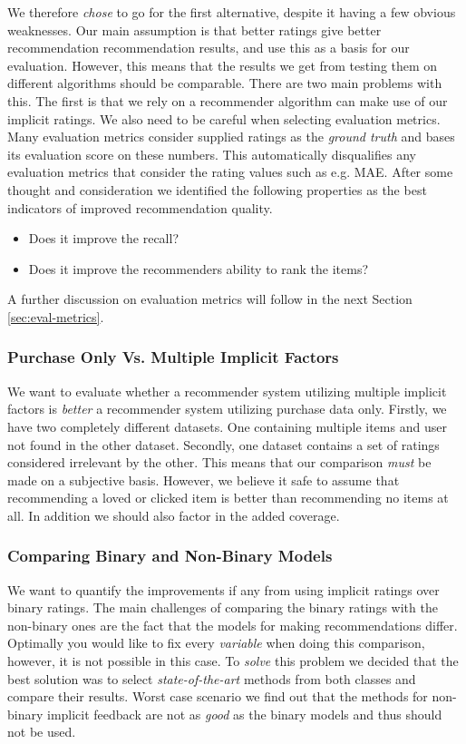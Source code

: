 We therefore \emph{chose} to go for the first alternative, despite it having a few obvious weaknesses.
Our main assumption is that better ratings give better recommendation recommendation results, and use this
as a basis for our evaluation. However, this means that the results we get from testing them
on different algorithms should be comparable. There are two main problems with this. The first is that
we rely on a recommender algorithm can make use of our implicit ratings. We also need to be careful
when selecting evaluation metrics. Many evaluation metrics consider supplied ratings as the \emph{ground truth}
and bases its evaluation score on these numbers. This automatically disqualifies any evaluation metrics
that consider the rating values such as e.g. MAE. After some thought and consideration
we identified the following properties as the best indicators of improved recommendation quality.

\begin{itemize}
\item Does it improve the recall?
\item Does it improve the recommenders ability to rank the items?
\end{itemize}

A further discussion on evaluation metrics will follow in the next Section \ref{sec:eval-metrics}.

\subsubsection{Purchase Only Vs. Multiple Implicit Factors}

We want to evaluate whether a recommender system utilizing multiple implicit factors is \emph{better}
a recommender system utilizing purchase data only. Firstly, we have two completely different datasets.
One containing multiple items and user not found in the other dataset. Secondly, one dataset
contains a set of ratings considered irrelevant by the other. This means that our comparison
\emph{must} be made on a subjective basis. However, we believe it safe to assume that recommending
a loved or clicked item is better than recommending no items at all. In addition we should also
factor in the added coverage.

\subsubsection{Comparing Binary and Non-Binary Models}

We want to quantify the improvements if any from using implicit ratings over binary ratings.
The main challenges of comparing the binary ratings with the non-binary ones are the fact
that the models for making recommendations differ. Optimally you would like to fix every
\emph{variable} when doing this comparison, however, it is not possible in this case.
To \emph{solve} this problem we decided that the best solution was to select \emph{state-of-the-art}
methods from both classes and compare their results. Worst case scenario we find out that the
methods for non-binary implicit feedback are not as \emph{good} as the binary models and thus
should not be used.

